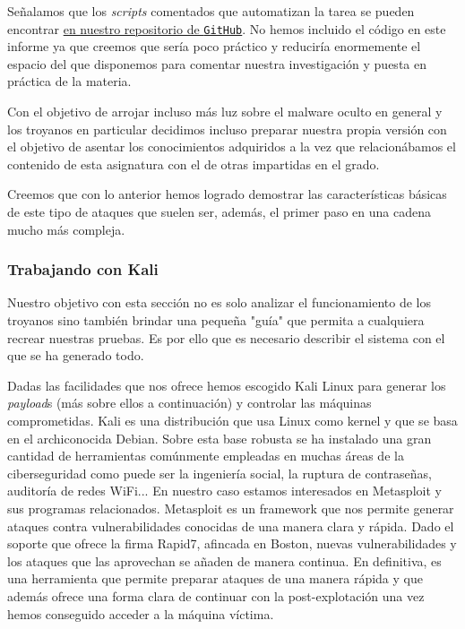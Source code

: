 \documentclass[12pt]{article}
\newcommand{\newpar} {
    \vskip 0.5cm
}
\begin{document}
            \newpar

            Señalamos que los \textit{scripts} comentados que automatizan la tarea se pueden encontrar \href{https://github.com/UAH-s-Telematics-Engineering-Tasks/info_sec_proj}{en nuestro repositorio de \texttt{GitHub}}. No hemos incluido el código en este informe ya que creemos que sería poco práctico y reduciría enormemente el espacio del que disponemos para comentar nuestra investigación y puesta en práctica de la materia.

            \newpar

            Con el objetivo de arrojar incluso más luz sobre el malware oculto en general y los troyanos en particular decidimos incluso preparar nuestra propia versión con el objetivo de asentar los conocimientos adquiridos a la vez que relacionábamos el contenido de esta asignatura con el de otras impartidas en el grado.

            \newpar

            Creemos que con lo anterior hemos logrado demostrar las características básicas de este tipo de ataques que suelen ser, además, el primer paso en una cadena mucho más compleja.

            \subsubsection{Trabajando con Kali}
                Nuestro objetivo con esta sección no es solo analizar el funcionamiento de los troyanos sino también brindar una pequeña "guía" que permita a cualquiera recrear nuestras pruebas. Es por ello que es necesario describir el sistema con el que se ha generado todo.

                \newpar

                Dadas las facilidades que nos ofrece hemos escogido Kali Linux para generar los \textit{payload}s (más sobre ellos a continuación) y controlar las máquinas comprometidas. Kali es una distribución que usa Linux como kernel y que se basa en el archiconocida Debian. Sobre esta base robusta se ha instalado una gran cantidad de herramientas comúnmente empleadas en muchas áreas de la ciberseguridad como puede ser la ingeniería social, la ruptura de contraseñas, auditoría de redes WiFi... En nuestro caso estamos interesados en Metasploit y sus programas relacionados. Metasploit es un framework que nos permite generar ataques contra vulnerabilidades conocidas de una manera clara y rápida. Dado el soporte que ofrece la firma Rapid7, afincada en Boston, nuevas vulnerabilidades y los ataques que las aprovechan se añaden de manera continua. En definitiva, es una herramienta que permite preparar ataques de una manera rápida y que además ofrece una forma clara de continuar con la post-explotación una vez hemos conseguido acceder a la máquina víctima.
\end{document}

